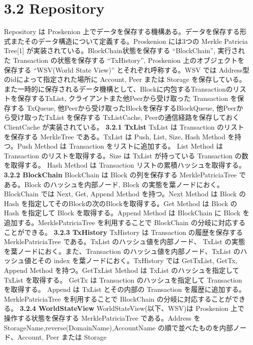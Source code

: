 \hypertarget{repository}{%
\section{3.2 Repository}\label{repository}}

Repository は Proskenion
上でデータを保存する機構ある。データを保存する形式またそのデータ構造について定義する。Proskenion
には3つの Merkle Patricia Tree{[}1{]}
が実装されている。BlockChain状態を保存する ``BlockChain'', 実行された
Transaction の状態を保存する ``TxHistory'', Proskenion
上のオブジェクトを保存する ``WSV(World State View)''
とそれぞれ呼称する。WSV では Address型のidによって指定された場所に
Account, Peer または Storage
を保存している。また一時的に保存されるデータ機構として、Blockに内包するTransactionのリストを保存するTxList,
クライアントまた他Peerから受け取った Transaction を保存する TxQueue,
他Peerから受け取ったBlockを保存するBlockQueue,
他Peerから受け取ったTxList を保存する TxListCache,
Peerの通信経路を保存しておくClientCache が実装されている。 \textbf{3.2.1
TxList} TxList は Transaction のリストを保存する MerkleTree
である。TxList は Push, List, Size, Hash Method を持つ。Push Method は
Transaction をリストに追加する。 List Method は Transaction
のリストを取得する。Size は TxList が持っている Transaction
の数を取得する。 Hash Method は Transaction
リストの累積ハッシュを取得する。 \textbf{3.2.2 BlockChain} BlockChain は
Block の列を保存する MerklePatriciaTree である。Block
のハッシュを内部ノード, Block の実態を葉ノードにおく。BlockChain では
Next, Get, Append Method を持つ。Next Method は Block の Hash
を指定してそのBlockの次のBlockを取得する。Get Method は Block の Hash
を指定して Block を取得する。Append Method は BlockChain に Block
を追加する。MerklePatriciaTree を利用することで BlockChain
の分岐に対応することができる。 \textbf{3.2.3 TxHistory} TxHistory は
Transaction の履歴を保存する MerklePatriciaTree である。TxList
のハッシュ値を内部ノード、 TxList
の実態を葉ノードにおく。また、Transaction
のハッシュ値を内部ノード、TxList のハッシュ値とその index
を葉ノードにおく。TxHistory では GetTxList, GetTx, Append Method
を持つ。GetTxList Method は TxList のハッシュを指定して TxList
を取得する。 GetTx は Transaction のハッシュを指定して Transaction
を取得する。 Append は TxList とその内部の Transaction
を履歴に追加する。MerklePatriciaTree を利用することで BlockChain
の分岐に対応することができる。 \textbf{3.2.4 WorldStateView}
WorldStateView(以下、WSV)は Proskenion 上で操作する状態を保存する
MerklePatriciaTree である。Address を
StorageName,reverse(DomainName),AccountName
の順で並べたものを内部ノード、Account, Peer または Storage
